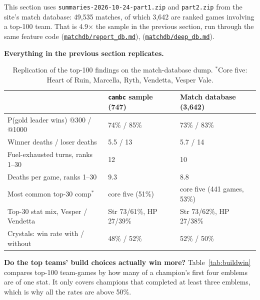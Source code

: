 \documentclass[11pt,a4paper]{article}
\newcommand{\data}{file:///Users/tristanbasri/Desktop/Code/battlecode-scrim-2026-10-25}
\newcommand{\src}[2]{{\small(\href{#1}{\textcolor{cTop}{\texttt{#2}}})}}
\begin{document}
This section uses \texttt{summaries-2026-10-24-part1.zip} and \texttt{part2.zip} from the site's match database: 49,535 matches, of which 3,642 are ranked games involving a top-100 team. That is 4.9$\times$ the sample in the previous section, run through the same feature code \src{\data/matchdb/report\_db.md}{matchdb/report\_db.md}, \src{\data/matchdb/deep\_db.md}{matchdb/deep\_db.md}.

\textbf{Everything in the previous section replicates.}

\begin{table}[H]
\centering\footnotesize\setlength{\tabcolsep}{5pt}
\begin{tabular}{lll}
\toprule
 & \texttt{cambc} sample (747) & Match database (3,642) \\
\midrule
P(gold leader wins) @300 / @1000 & 74\% / 85\% & 73\% / 83\% \\
Winner deaths / loser deaths & 5.5 / 13 & 5.7 / 14 \\
Fuel-exhausted turns, ranks 1--30 & 12 & 10 \\
Deaths per game, ranks 1--30 & 9.3 & 8.8 \\
Most common top-30 comp$^{*}$ & core five (51\%) & core five (441 games, 53\%) \\
Top-30 stat mix, Vesper / Vendetta & Str 73/61\%, HP 27/39\% & Str 73/62\%, HP 27/38\% \\
Crystals: win rate with / without & 48\% / 52\% & 52\% / 50\% \\
\bottomrule
\end{tabular}
\caption{Replication of the top-100 findings on the match-database dump. $^{*}$Core five: Heart of Ruin, Marcella, Ryth, Vendetta, Vesper Vale.}
\end{table}

\textbf{Do the top teams' build choices actually win more?} Table~\ref{tab:buildwin} compares top-100 team-games by how many of a champion's first four emblems are of one stat. It only covers champions that completed at least three emblems, which is why all the rates are above 50\%.
\end{document}
